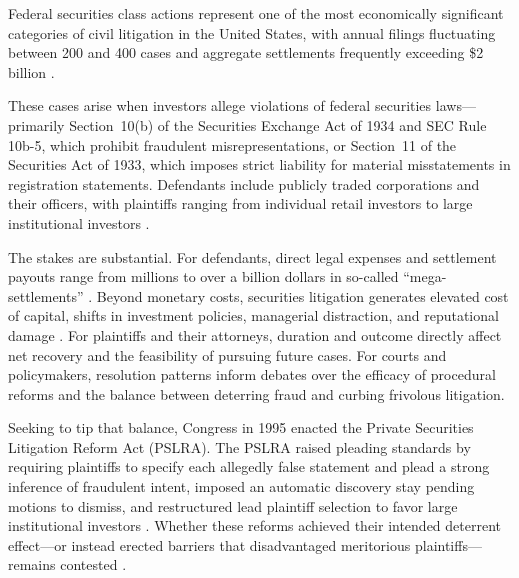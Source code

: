 Federal securities class actions represent one of the most
economically significant categories of civil litigation in the
United States, with annual filings fluctuating between 200 and
400 cases and aggregate settlements frequently exceeding \$2
billion \citep{cornerstone2024, nera2024}. 

These cases arise when investors allege violations of federal
securities laws---primarily Section~10(b) of the Securities
Exchange Act of 1934 and SEC Rule 10b-5, which prohibit
fraudulent misrepresentations, or Section~11 of the Securities
Act of 1933, which imposes strict liability for material
misstatements in registration statements. Defendants include
publicly traded corporations and their officers, with plaintiffs
ranging from individual retail investors to large institutional
investors \citep{cox2008, cheng2010}.

The stakes are substantial. For defendants, direct legal
expenses and settlement payouts range from millions to over a
billion dollars in so-called ``mega-settlements''
\citep{cornerstone2024}. Beyond monetary costs, securities
litigation generates elevated cost of capital, shifts in
investment policies, managerial distraction, and reputational
damage \citep{karpoff2008, graham2008}. For plaintiffs and their
attorneys, duration and outcome directly affect net recovery and
the feasibility of pursuing future cases. For courts and
policymakers, resolution patterns inform debates over the
efficacy of procedural reforms and the balance between deterring
fraud and curbing frivolous litigation.

Seeking to tip that balance, Congress in 1995 enacted the Private
Securities Litigation Reform Act (PSLRA). The PSLRA raised pleading standards by requiring
plaintiffs to specify each allegedly false statement and plead a
strong inference of fraudulent intent, imposed an automatic
discovery stay pending motions to dismiss, and restructured lead
plaintiff selection to favor large institutional investors
\citep{perino2003, choi2007}. Whether these reforms achieved their
intended deterrent effect---or instead erected barriers that
disadvantaged meritorious plaintiffs---remains contested
\citep{choi2007}.

